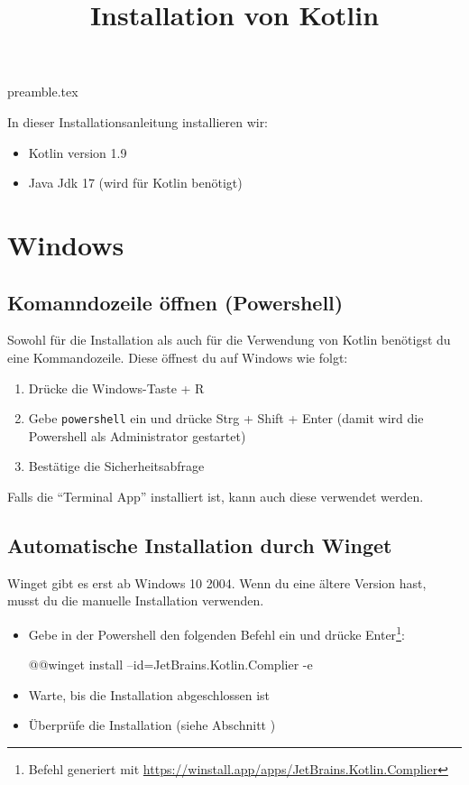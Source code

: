 \RequirePackage{import}
{preamble.tex}
\usepackage{hyperref}
\title{Installation von Kotlin}


\maketitle


In dieser Installationsanleitung installieren wir:
\begin{itemize}
    \item Kotlin version 1.9
    \item Java Jdk 17 (wird für Kotlin benötigt)
\end{itemize}
\section*{Windows}
\subsection*{Komanndozeile öffnen (Powershell)}
Sowohl für die Installation als auch für die Verwendung von Kotlin benötigst du eine Kommandozeile. Diese öffnest du auf Windows wie folgt:
\begin{enumerate}
    \item Drücke die Windows-Taste + R
    \item Gebe \texttt{powershell} ein und drücke Strg + Shift + Enter (damit wird die Powershell als Administrator gestartet)
    \item Bestätige die Sicherheitsabfrage
\end{enumerate}
\begin{hinweis}
    Falls die \enquote{Terminal App} installiert ist, kann auch diese verwendet werden.
\end{hinweis}
\subsection*{Automatische Installation durch Winget}
\begin{hinweis}
    Winget gibt es erst ab Windows 10 2004. Wenn du eine ältere Version hast, musst du die manuelle Installation verwenden.
\end{hinweis}
\begin{itemize}
    \item Gebe in der Powershell den folgenden Befehl ein und drücke Enter\footnote{Befehl generiert mit \url{https://winstall.app/apps/JetBrains.Kotlin.Complier}}:
    \begin{commandshell}
        @\shellprefix{}@winget install --id=JetBrains.Kotlin.Complier -e
    \end{commandshell}
    \item Warte, bis die Installation abgeschlossen ist
    \item Überprüfe die Installation (siehe Abschnitt )
\end{itemize}
\clearpage
